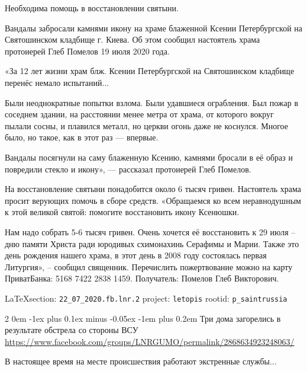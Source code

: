 \documentclass[a4paper,11pt]{extreport}
\makeatletter
\renewcommand\subsection{%
  \clearpage
    \@startsection{subsection}%
    {2}%
    {0em}%
    {-1ex plus 0.1ex minus -0.05ex}%
    {-1em plus 0.2em}%
    {\scshape\bfseries\Large}%
}
\makeatother
\begin{document}
Необходима помощь в восстановлении святыни.

Вандалы забросали камнями икону на храме блаженной Ксении Петербургской на
Святошинском кладбище г. Киева.  Об этом сообщил настоятель храма протоиерей
Глеб Помелов 19 июля 2020 года.

«За 12 лет жизни храм блж. Ксении Петербургской на Святошинском кладбище
перенёс немало испытаний...

Были неоднократные попытки взлома.  Были удавшиеся ограбления. Был пожар в
соседнем здании, на расстоянии менее метра от храма, от которого вокруг пылали
сосны, и плавился металл, но церкви огонь даже не коснулся.  Многое было, но
такое, как в этот раз --- впервые.

Вандалы посягнули на саму блаженную Ксению, камнями бросали в её образ и
повредили стекло и икону», --- рассказал протоиерей Глеб Помелов.

На восстановление святыни понадобится около 6 тысяч гривен. Настоятель храма
просит верующих помочь в сборе средств.  «Обращаемся ко всем неравнодушным к
этой великой святой: помогите восстановить икону Ксенюшки.

Нам надо собрать 5-6 тысяч гривен. Очень хочется её восстановить к 29 июля –
дню памяти Христа ради юродивых схимонахинь Серафимы и Марии.  Также это день
рождения нашего храма, в этот день в 2008 году состоялась первая Литургия», –
сообщил священник.  Перечислить пожертвование можно на карту ПриватБанка: 5168
7422 2838 1459.  Получатель: Помелов Глеб Викторович.
  
 
 
  
\vspace{0.5cm}
{\small\LaTeX section: \verb|22_07_2020.fb.lnr.2| project: \verb|letopis| rootid: \verb|p_saintrussia|}
\vspace{0.5cm}
  
\subsection{Три дома загорелись в результате обстрела со стороны ВСУ}
\label{sec:22_07_2020.fb.lnr.2}
\url{https://www.facebook.com/groups/LNRGUMO/permalink/2868634923248063/}

В настоящее время на месте происшествия работают экстренные службы...
\end{document}
